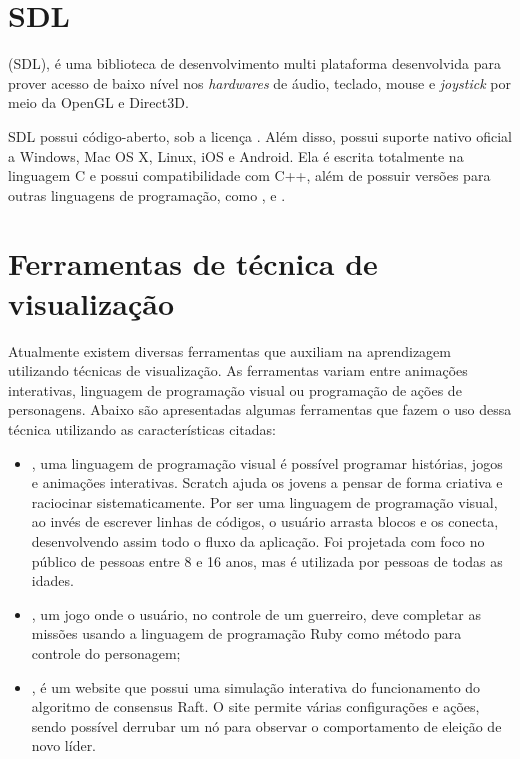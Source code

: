 \documentclass[12pt, %
openright,
oneside, %
a4paper,    %
brazil]{facom-ufu-abntex2}
\begin{document}
\section{SDL}
 (SDL), é uma biblioteca de desenvolvimento multi plataforma desenvolvida para prover acesso de baixo nível nos \textit{hardwares} de áudio, teclado, mouse e \textit{joystick} por meio da OpenGL e Direct3D.

SDL possui código-aberto, sob a licença . Além disso, possui suporte nativo oficial a Windows, Mac OS X, Linux, iOS e Android. Ela é escrita totalmente na linguagem C e possui compatibilidade com C++, além de possuir versões para outras linguagens de programação, como ,  e .

\section{Ferramentas de técnica de visualização}
Atualmente existem diversas ferramentas que auxiliam na aprendizagem utilizando técnicas de visualização. As ferramentas variam entre animações interativas, linguagem de programação visual ou programação de ações de personagens. Abaixo são apresentadas algumas ferramentas que fazem o uso dessa técnica utilizando as características citadas:

\begin{itemize}

    \item {}, uma linguagem de programação visual é possível programar histórias, jogos e animações interativas. Scratch ajuda os jovens a pensar de forma criativa e raciocinar sistematicamente. Por ser uma linguagem de programação visual, ao invés de escrever linhas de códigos, o usuário arrasta blocos e os conecta, desenvolvendo assim todo o fluxo da aplicação. Foi projetada com foco no público de pessoas entre 8 e 16 anos, mas é utilizada por pessoas de todas as idades.

    \item {}, um jogo onde o usuário, no controle de um guerreiro, deve completar as missões usando a linguagem de programação Ruby como método para controle do personagem;

    \item {}, é um website que possui uma simulação interativa do funcionamento do algoritmo de consensus Raft. O site permite várias configurações e ações, sendo possível derrubar um nó para observar o comportamento de eleição de novo líder.

\end{itemize}
\end{document}
